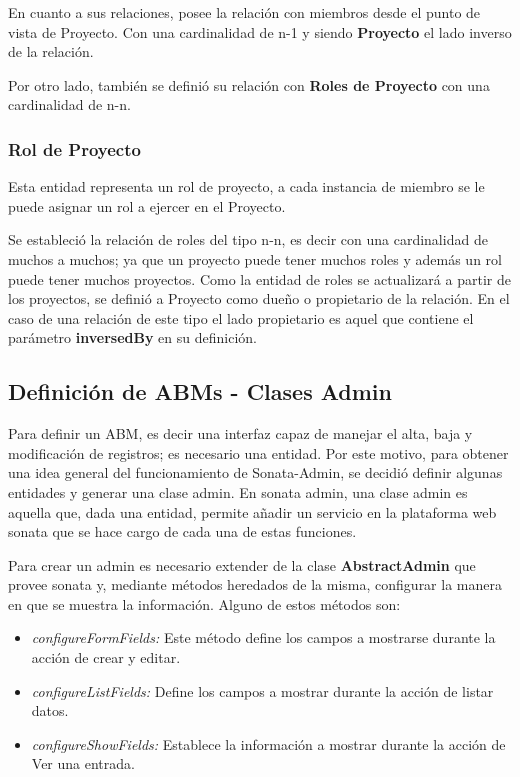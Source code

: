 \documentclass{article}
\begin{document}
En cuanto a sus relaciones, posee la relación con miembros desde el punto de vista de Proyecto. Con una cardinalidad de n-1 y siendo \textbf{Proyecto} el lado
inverso de la relación.

Por otro lado, también se definió su relación con \textbf{Roles de Proyecto} con una cardinalidad de n-n.

\subsubsection{Rol de Proyecto}%
\label{ssub:rol_de_proyecto_modelo}
Esta entidad representa un rol de proyecto, a cada instancia de miembro se le puede asignar un rol a ejercer en el Proyecto.

Se estableció la relación de roles del tipo n-n, es decir con una cardinalidad de muchos a muchos; ya que un proyecto puede tener muchos roles y además
un rol puede tener muchos proyectos\@. Como la entidad de roles se actualizará a partir de los proyectos, se definió a Proyecto como dueño o propietario de
la relación. En el caso de una relación de este tipo el lado propietario es aquel que contiene el parámetro \textbf{inversedBy} en su definición.

\subsection{Definición de ABMs - Clases Admin}%
\label{sub:definición_de_abms_clases_admin}

Para definir un ABM, es decir una interfaz capaz de manejar el alta, baja y modificación de registros; es necesario una entidad. Por este motivo, para obtener
una idea general del funcionamiento de Sonata-Admin, se decidió definir algunas entidades y generar una clase admin\@.
En sonata admin, una clase admin es aquella que, dada una entidad, permite añadir un servicio en la plataforma web sonata que se hace cargo de cada una de estas funciones.

Para crear un admin es necesario extender de la clase \textbf{AbstractAdmin} que provee sonata y, mediante métodos heredados de la misma, configurar la manera en
que se muestra la información\@.
Alguno de estos métodos son:

\begin{itemize}
    \item \textit{configureFormFields:} Este método define los campos a mostrarse durante la acción de crear y editar.
    \item \textit{configureListFields:} Define los campos a mostrar durante la acción de listar datos.
    \item \textit{configureShowFields:} Establece la información a mostrar durante la acción de Ver una entrada.
\end{itemize}
\end{document}
